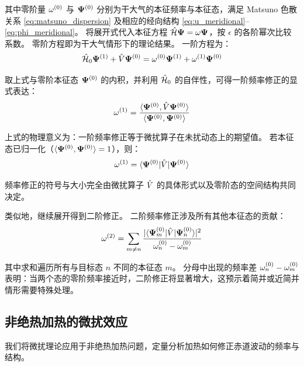 其中零阶量 $\omega^{(0)}$ 与 $\bm{\Psi}^{(0)}$ 分别为干大气的本征频率与本征态，满足 Matsuno 色散关系 \eqref{eq:matsuno_dispersion} 及相应的经向结构 \eqref{eq:u_meridional}--\eqref{eq:phi_meridional}。
将展开式代入本征方程 $\hat{\mathcal{H}} \bm{\Psi} = \omega \bm{\Psi}$，按 $\epsilon$ 的各阶幂次比较系数。
零阶方程即为干大气情形下的理论结果。
一阶方程为：
\begin{equation}
    \hat{\mathcal{H}}_0 \bm{\Psi}^{(1)} + \hat{V} \bm{\Psi}^{(0)} = \omega^{(0)} \bm{\Psi}^{(1)} + \omega^{(1)} \bm{\Psi}^{(0)}
    \label{eq:first_order_eq}
\end{equation}

取上式与零阶本征态 $\bm{\Psi}^{(0)}$ 的内积，并利用 $\hat{\mathcal{H}}_0$ 的自伴性，可得一阶频率修正的显式表达：
\begin{equation}
    \omega^{(1)} = \frac{\langle \bm{\Psi}^{(0)}, \hat{V} \bm{\Psi}^{(0)} \rangle}{\langle \bm{\Psi}^{(0)}, \bm{\Psi}^{(0)} \rangle}
    \label{eq:first_order_correction}
\end{equation}

上式的物理意义为：一阶频率修正等于微扰算子在未扰动态上的期望值。
若本征态已归一化（$\langle \bm{\Psi}^{(0)}, \bm{\Psi}^{(0)} \rangle = 1$），则：
\begin{equation}
    \omega^{(1)} = \langle \bm{\Psi}^{(0)} | \hat{V} | \bm{\Psi}^{(0)} \rangle
    \label{eq:first_order_simple}
\end{equation}

频率修正的符号与大小完全由微扰算子 $\hat{V}$ 的具体形式以及零阶态的空间结构共同决定。

类似地，继续展开得到二阶修正。
二阶频率修正涉及所有其他本征态的贡献：
\begin{equation}
    \omega^{(2)} = \sum_{m \neq n} \frac{\lvert \langle \bm{\Psi}_m^{(0)} | \hat{V} | \bm{\Psi}_n^{(0)} \rangle \rvert^2}{\omega_n^{(0)} - \omega_m^{(0)}}
    \label{eq:second_order_correction}
\end{equation}

其中求和遍历所有与目标态 $n$ 不同的本征态 $m$。
分母中出现的频率差 $\omega_n^{(0)} - \omega_m^{(0)}$ 表明：当两个态的零阶频率接近时，二阶修正将显著增大，这预示着简并或近简并情形需要特殊处理。

\subsection{非绝热加热的微扰效应}
\label{subsec:heating_perturbation}

我们将微扰理论应用于非绝热加热问题，定量分析加热如何修正赤道波动的频率与结构。

